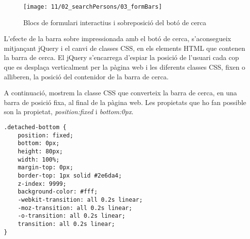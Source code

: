 \begin{figure}
    \texttt{[image: 11/02\_searchPersons/03\_formBars]}
    \centering
    \caption{Blocs de formulari interactius i sobreposició del botó de cerca}\label{fig:interactiveFormBloc}
\end{figure}

L'efecte de la barra sobre impressionada amb el botó de cerca, s'aconsegueix mitjançant jQuery i el canvi de classes CSS, en els elements HTML que contenen la barra de cerca. El jQuery s'encarrega d'espiar la posició de l'usuari cada cop que es desplaça verticalment per la pàgina web i les diferents classes CSS, fixen o alliberen, la posició del contenidor de la barra de cerca.

A continuació, mostrem la classe CSS que converteix la barra de cerca, en una barra de posició fixa, al final de la pàgina web. Les propietats que ho fan possible son la propietat, \emph{position:fixed} i \emph{bottom:0px}.

\begin{lstlisting}[style=rawOwn,caption={Classe CSS per sobre impressionar el botó de cerca}]
.detached-bottom {
    position: fixed;
    bottom: 0px;
    height: 80px;
    width: 100%;
    margin-top: 0px;
    border-top: 1px solid #2e6da4;
    z-index: 9999;
    background-color: #fff;
    -webkit-transition: all 0.2s linear;
    -moz-transition: all 0.2s linear;
    -o-transition: all 0.2s linear;
    transition: all 0.2s linear;
}
\end{lstlisting}
